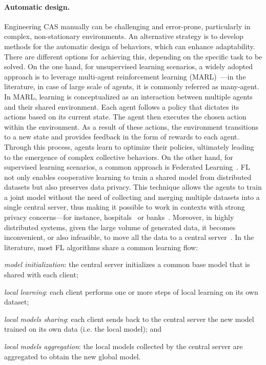 \documentclass[12pt]{article}
\begin{document}
\paragraph{Automatic design.}
Engineering CAS manually can be challenging and error-prone, particularly in complex, 
 non-stationary environments. 
% 
An alternative strategy is to develop methods for the automatic design 
 of behaviors, which can enhance adaptability.
%
There are different options for achieving this, depending on the specific task to be solved. 
%
On the one hand, for unsupervised learning scenarios, a widely adopted approach is to leverage multi-agent 
 reinforcement learning (MARL)~\cite{DBLP:journals/corr/abs-1911-10635,DBLP:journals/tsmc/BusoniuBS08}---in the 
 literature, in case of large scale of agents, it is commonly referred as many-agent. 
% 
In MARL, learning is conceptualized as an interaction between multiple agents and their shared environment. 
%
Each agent follows a policy that dictates its actions based on its current state. 
%
The agent then executes the chosen action within the environment. 
%
As a result of these actions, the environment transitions to a new state and provides feedback 
 in the form of rewards to each agent. 
% 
Through this process, agents learn to optimize their policies, ultimately leading to the 
 emergence of complex collective behaviors.
%
On the other hand, for supervised learning scenarios, a common approach is 
 Federated Learning~\cite{DBLP:conf/aistats/McMahanMRHA17}.
%
FL not only enables cooperative learning to train a shared model from distributed datasets
 but also preserves data privacy.
%
This technique allows the agents to train a joint model without the need of collecting and merging
 multiple datasets into a single central server, thus making it possible to work in contexts with strong 
 privacy concerns---for instance, hospitals~\cite{DBLP:journals/csur/NguyenPPDSLDH23} 
 or banks~\cite{DBLP:series/lncs/LongT0Z20}.
%
Moreover, in highly distributed systems, given the large volume of generated data, it becomes inconvenient, 
 or also infeasible, to move all the data to a central server~\cite{DBLP:journals/comsur/NguyenDPSLP21}.
%
In the literature, most FL algorithms share a common learning flow: 
 \begin{enumerate*}[label=(\roman*)]
	\item \emph{model initialization}: the central server initializes a common base model that is shared with each client;
	\item \emph{local learning}: each client performs one or more steps of local learning on its own dataset;
	\item \emph{local models sharing}: each client sends back to the central server the new model trained on its own data 
     (i.e. the local model); and
	\item \emph{local models aggregation}: the local models collected by the central server are aggregated to obtain the 
     new global model.
 \end{enumerate*}
\end{document}
